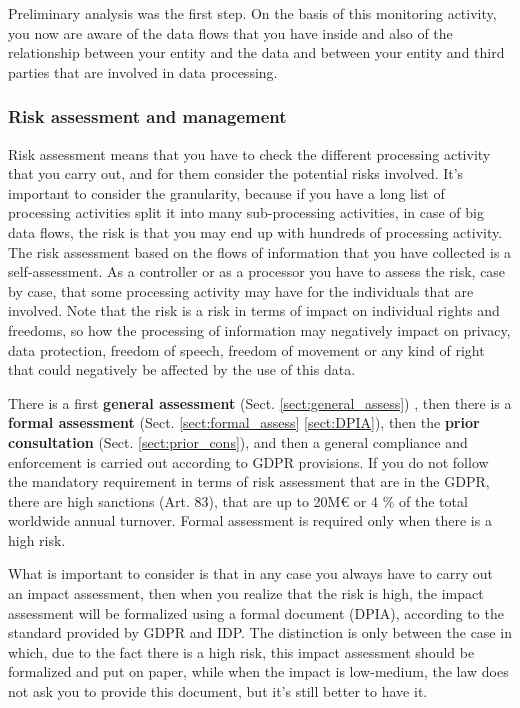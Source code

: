 Preliminary analysis was the first step. On the basis of this monitoring activity, you now are aware of the data flows that you have inside and also of the relationship between your entity and the data and between your entity and third parties that are involved in data processing.
\subsubsection{Risk assessment and management}
Risk assessment means that you have to check the different processing activity that you carry out, and for them consider the potential risks involved.
It's important to consider the granularity, because if you have a long list of processing activities split it into many sub-processing activities, in case of big data flows, the risk is that you may end up with hundreds of processing activity.
The risk assessment based on the flows of information that you have collected is a self-assessment. As a controller or as a processor you have to assess the risk, case by case, that some processing activity may have for the individuals that are involved. Note that the risk is a risk in terms of impact on individual rights and freedoms, so how the processing of information may negatively impact on privacy, data protection, freedom of speech, freedom of movement or any kind of right that could negatively be affected by the use of this data.

There is a first \textbf{general assessment} (Sect. \ref{sect:general_assess}) , then there is a \textbf{formal assessment} (Sect. \ref{sect:formal_assess} \ref{sect:DPIA}), then the \textbf{prior consultation} (Sect. \ref{sect:prior_cons}), and then a general compliance and enforcement is carried out according to GDPR provisions. If you do not follow the mandatory requirement in terms of risk assessment that are in the GDPR, there are high sanctions (Art. 83), that are up to 20M€ or 4 \% of the total worldwide annual turnover. Formal assessment is required only when there is a high risk.

What is important to consider is that in any case you always have to carry out an impact assessment, then when you realize that the risk is high, the impact assessment will be formalized using a formal document (DPIA), according to the standard provided by GDPR and IDP. The distinction is only between the case in which, due to the fact there is a high risk, this impact assessment should be formalized and put on paper, while when the impact is low-medium, the law does not ask you to provide this document, but it's still better to have it.

